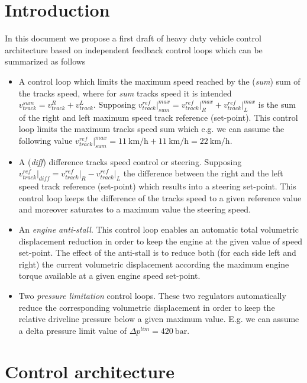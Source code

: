 \documentclass[11pt,a4paper,oneside]{book}
\begin{document}
\begin{onehalfspace}
\section{Introduction}
In this document we propose a first draft of heavy duty vehicle control architecture based on independent feedback control loops which can be summarized as follows
\begin{itemize}
	\item A control loop which limits the maximum speed reached by the (\textit{sum}) sum of the tracks speed, where for \textit{sum} tracks speed it is intended $v_{track}^{sum} = v_{track}^{R} + v_{track}^{L}$. Supposing $v_{track}^{ref}\Big|_{sum}^{max} = v_{track}^{ref}\Big|_{R}^{max} + v_{track}^{ref}\Big|_{L}^{max}$ is the sum of the right and left maximum speed track reference (set-point). This control loop limits the maximum tracks  speed sum which e.g. we can assume the following value $v_{track}^{ref}\Big|_{sum}^{max} = \SI{11}{\kilo\meter\per\hour} + \SI{11}{\kilo\meter\per\hour} = \SI{22}{\kilo\meter\per\hour}$.
	\item A (\textit{diff}) difference tracks speed control or steering. Supposing $v_{track}^{ref}\Big|_{diff} = v_{track}^{ref}\Big|_{R} - v_{track}^{ref}\Big|_{L}$ the difference between the right and the left speed track reference (set-point) which results into a steering set-point. This control loop keeps the difference of the tracks speed to a given reference value and moreover saturates to a maximum value the steering speed.
	\item An \textit{engine anti-stall}. This control loop enables an automatic total volumetric displacement reduction in order to keep the engine at the given value of speed set-point. The effect of the anti-stall is to reduce both (for each side left and right) the current volumetric displacement according the maximum engine torque available at a given engine speed set-point. 
	\item Two \textit{pressure limitation} control loops. These two regulators automatically reduce the corresponding volumetric displacement in order to keep the relative driveline pressure below a given maximum value. E.g. we can assume a delta pressure limit value of $\Delta p^{lim}=\SI{420}{\bar}$.
\end{itemize}
\section{Control architecture}

\end{onehalfspace}
\end{document}
